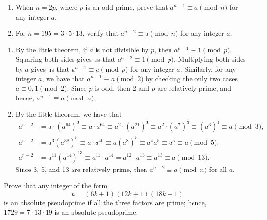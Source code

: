 \begin{exercise}
    \begin{enumerate}
        \item When $n = 2p$, where $p$ is an odd prime, prove that $a^{n-1} \equiv a \pmod{n}$ for any integer $a$.
        \item For $n = 195 = 3 \cdot 5 \cdot 13$, verify that $a^{n-2} \equiv a \pmod{n}$ for any integer $a$.
    \end{enumerate}
\end{exercise}

\begin{solution}
    \begin{enumerate}
        \item By the little theorem, if $a$ is not divisible by $p$, then $a^{p-1} \equiv 1 \pmod p$. Squaring both sides gives us that $a^{n-2} \equiv 1 \pmod p$. Multiplying both sides by $a$ gives us that $a^{n-1} \equiv a \pmod p$ for any integer $a$. Similarly, for any integer $a$, we have that $a^{n-1} \equiv a \pmod 2$ by checking the only two cases $a \equiv 0,1 \pmod{2}$. Since $p$ is odd, then 2 and $p$ are relatively prime, and hence, $a^{n-1} \equiv a \pmod{n}$.
        \item By the little theorem, we have that
        \begin{align*}
            a^{n-2} &= a\cdot (a^{64})^3 \equiv a \cdot a^{64} \equiv a^2 \cdot (a^{21})^3 \equiv a^2 \cdot (a^7)^3 \equiv (a^3)^3 \equiv a \pmod 3, \\
            a^{n-2} &= a^3 (a^{38})^5 \equiv a \cdot a^{40} \equiv a (a^8)^5 \equiv a^4a^5 \equiv a^5 \equiv a \pmod 5,\\
            a^{n-2} &= a^{11}(a^{14})^{13} \equiv a^{11} \cdot a^{14} = a^{12}\cdot a^{13} \equiv a^{13} \equiv a \pmod{13}.
        \end{align*}
        Since 3, 5, and 13 are relatively prime, then $a^{n-2} \equiv a \pmod{n}$ for all $a$.\\
    \end{enumerate}
\end{solution}

\begin{exercise}
    Prove that any integer of the form
    $$n = (6k+1)(12k+1)(18k+1)$$
    is an absolute pseudoprime if all the three factors are prime; hence, $1729 = 7 \cdot 13 \cdot 19$ is an absolute pseudoprime. \\
\end{exercise}

